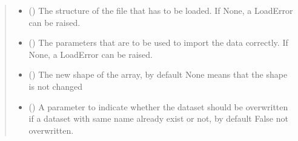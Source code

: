 \documentclass[letterpaper,10pt,english]{sphinxmanual}
\begin{document}
\begin{fulllineitems}
\begin{fulllineitems}
\begin{quote}
\begin{description}
\begin{itemize}
\item {} 
\sphinxAtStartPar
{} (\sphinxstyleliteralemphasis{\sphinxupquote{, }}) \textendash{} The structure of the file that has to be loaded. If None, a LoadError can be raised.

\item {} 
\sphinxAtStartPar
{} (\sphinxstyleliteralemphasis{\sphinxupquote{, }}) \textendash{} The parameters that are to be used to import the data correctly.  If None, a LoadError can be raised.

\item {} 
\sphinxAtStartPar
{} (\sphinxstyleliteralemphasis{\sphinxupquote{, }}) \textendash{} The new shape of the array, by default None means that the shape is not changed

\item {} 
\sphinxAtStartPar
{} (\sphinxstyleliteralemphasis{\sphinxupquote{, }}) \textendash{} A parameter to indicate whether the dataset should be overwritten if a dataset with same name already exist or not, by default False \sphinxhyphen{} not overwritten.

\end{itemize}

\end{description}\end{quote}

\end{fulllineitems}



\end{fulllineitems}
\end{document}
